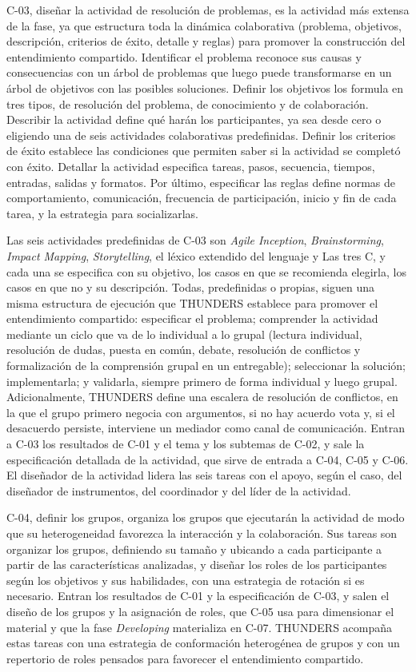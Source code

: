 \documentclass[12pt,letterpaper,oneside]{report}
\begin{document}
C-03, diseñar la actividad de resolución de problemas, es la actividad más
extensa de la fase, ya que estructura toda la dinámica colaborativa (problema,
objetivos, descripción, criterios de éxito, detalle y reglas) para promover la
construcción del entendimiento compartido. Identificar el problema reconoce sus
causas y consecuencias con un árbol de problemas que luego puede transformarse
en un árbol de objetivos con las posibles soluciones. Definir los objetivos los
formula en tres tipos, de resolución del problema, de conocimiento y de
colaboración. Describir la actividad define qué harán los participantes, ya sea
desde cero o eligiendo una de seis actividades colaborativas predefinidas.
Definir los criterios de éxito establece las condiciones que permiten saber si
la actividad se completó con éxito. Detallar la actividad especifica tareas,
pasos, secuencia, tiempos, entradas, salidas y formatos. Por último, especificar las
reglas define normas de comportamiento, comunicación, frecuencia de
participación, inicio y fin de cada tarea, y la estrategia para socializarlas.

Las seis actividades predefinidas de C-03 son \textit{Agile Inception},
\textit{Brainstorming}, \textit{Impact Mapping}, \textit{Storytelling}, el
léxico extendido del lenguaje y Las tres C, y cada una se especifica con su
objetivo, los casos en que se recomienda elegirla, los casos en que no y su
descripción. Todas, predefinidas o propias, siguen una misma estructura de
ejecución que THUNDERS establece para promover el entendimiento compartido:
especificar el problema; comprender la actividad mediante un ciclo que va de lo
individual a lo grupal (lectura individual, resolución de dudas, puesta en
común, debate, resolución de conflictos y formalización de la comprensión
grupal en un entregable); seleccionar la solución; implementarla; y validarla,
siempre primero de forma individual y luego grupal. Adicionalmente,
THUNDERS define una escalera de resolución de conflictos, en la que el grupo primero negocia con
argumentos, si no hay acuerdo vota y, si el desacuerdo persiste, interviene un
mediador como canal de comunicación. Entran a C-03 los resultados de C-01 y el
tema y los subtemas de C-02, y sale la especificación detallada de la
actividad, que sirve de entrada a C-04, C-05 y C-06. El diseñador de la actividad lidera
las seis tareas con el apoyo, según el caso, del diseñador de instrumentos, del
coordinador y del líder de la actividad.

C-04, definir los grupos, organiza los grupos que ejecutarán la actividad de
modo que su heterogeneidad favorezca la interacción y la colaboración. Sus
tareas son organizar los grupos, definiendo su tamaño y ubicando a cada
participante a partir de las características analizadas, y diseñar los roles
de los participantes según los objetivos y sus habilidades, con una estrategia
de rotación si es necesario. Entran los resultados de C-01 y la especificación de
C-03, y salen el diseño de los grupos y la asignación de roles, que C-05 usa
para dimensionar el material y que la fase \textit{Developing} materializa en
C-07. THUNDERS acompaña estas tareas con una estrategia de conformación
heterogénea de grupos y con un repertorio de roles pensados para favorecer el
entendimiento compartido.
\end{document}
